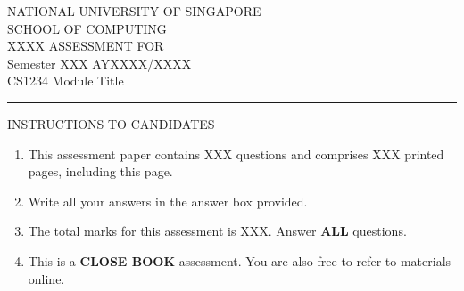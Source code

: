 \renewcommand{\arraystretch}{1.25} 
\begin{center}
\vspace{1.5in}
{\sf\large NATIONAL UNIVERSITY OF SINGAPORE} \\

\vspace{0.5in}
{\sf\large SCHOOL OF COMPUTING } \\
{\sf\large XXXX ASSESSMENT FOR } \\
{\sf\large Semester XXX AYXXXX/XXXX} \\

\vspace{0.3in}
{\large{\sf CS1234 Module Title}} \\

\vspace{0.2in}
\end{center}

\begin{center}
\rule{6in}{0.05in}
\end{center}

\vspace{.2in}
\noindent
{\Large{\sf INSTRUCTIONS TO CANDIDATES}}

\begin{enumerate}
\item This assessment paper contains XXX questions and comprises XXX printed pages, including this page.
\item Write all your answers in the answer box provided.
\item The total marks for this assessment is XXX.  Answer {\bf ALL} questions.
\item This is a {\bf CLOSE BOOK} assessment.  You are also free to refer to materials online.
\end{enumerate}

\pagebreak
